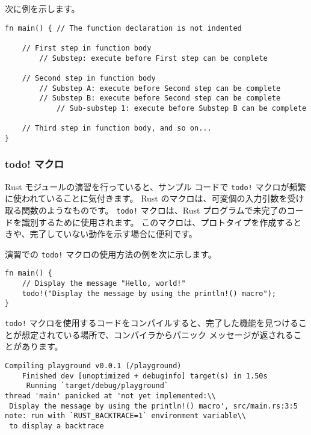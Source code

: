 次に例を示します。

\begin{lstlisting}[numbers=none]
fn main() { // The function declaration is not indented

    // First step in function body
        // Substep: execute before First step can be complete

    // Second step in function body
        // Substep A: execute before Second step can be complete
        // Substep B: execute before Second step can be complete
            // Sub-substep 1: execute before Substep B can be complete

    // Third step in function body, and so on...
}
\end{lstlisting}

\subsubsection{todo! マクロ}


Rust モジュールの演習を行っていると、サンプル コードで \texttt{todo!} マクロが頻繁に使われていることに気付きます。 Rust のマクロは、可変個の入力引数を受け取る関数のようなものです。 \texttt{todo!} マクロは、Rust プログラムで未完了のコードを識別するために使用されます。 このマクロは、プロトタイプを作成するときや、完了していない動作を示す場合に便利です。

演習での \texttt{todo!} マクロの使用方法の例を次に示します。



\begin{lstlisting}[numbers=none]
fn main() {
    // Display the message "Hello, world!"
    todo!("Display the message by using the println!() macro");
}
\end{lstlisting}

\texttt{todo!} マクロを使用するコードをコンパイルすると、完了した機能を見つけることが想定されている場所で、コンパイラからパニック メッセージが返されることがあります。

\begin{lstlisting}[numbers=none]
   Compiling playground v0.0.1 (/playground)
    Finished dev [unoptimized + debuginfo] target(s) in 1.50s
     Running `target/debug/playground`
thread 'main' panicked at 'not yet implemented:\\
 Display the message by using the println!() macro', src/main.rs:3:5
note: run with `RUST_BACKTRACE=1` environment variable\\
 to display a backtrace
\end{lstlisting}

